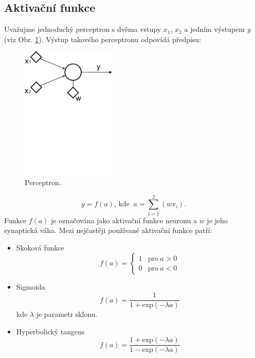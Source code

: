 {\subsection*{Aktivační funkce}
\par{Uvažujme jednoduchý perceptron s dvěma vstupy  $x_1$, $x_2$ a jedním výstupem $y$ (viz Obr. \ref{fig:NN02}). Výstup takového perceptronu odpovídá předpisu:
\begin{figure}[!ht]
	\centering
	\includegraphics[width = 0.4\textwidth, trim = 0cm 18cm 0cm 0cm]{./Img/Prednaska09/nn/NN02.pdf}
	\caption{Perceptron.}
	\label{fig:NN02}
\end{figure}
\begin{displaymath}
	y=f\left(a\right)\text{, kde }~a=\sum_{i=1}^2\left(wx_i\right).
\end{displaymath}
Funkce $f\left(a\right)$ je označována jako aktivační funkce neuronu a $w$ je jeho synaptická váha. Mezi nejčastěji používané aktivační funkce patří:
\begin{itemize}
	\item Skoková funkce
		\begin{equation}
			f\left(a\right)=\left\{
			\begin{array}{ll}
				1 & \text{pro}~a>0 \\
				0 & \text{pro}~a<0
			\end{array} \right.
		\end{equation}
	\item Sigmoida
		\begin{equation}
			f\left(a\right)=\frac{1}{1+\mathrm{exp}\left(-\lambda a\right)}
		\end{equation}
		kde $\lambda$ je parametr sklonu.
	\item Hyperbolický tangens
		\begin{equation}
			f\left(a\right)=\frac{1+\mathrm{exp}\left(-\lambda a\right)}{1-\mathrm{exp}\left(-\lambda a\right)}
		\end{equation}
\end{itemize}}

}
